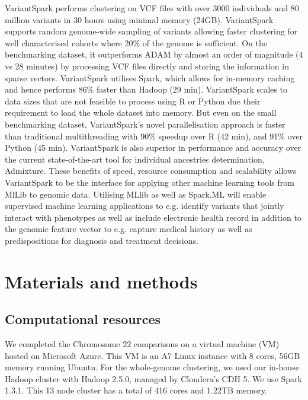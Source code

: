 \documentclass{bmcart}
\newcommand{\variantSpark}{{\sc VariantSpark}}
\begin{document}
\variantSpark{} performs clustering on VCF files with over 3000 individuals and 80 million variants in 30 hours using minimal memory (24GB). 
\variantSpark{} supports random genome-wide sampling of variants allowing faster clustering for well characterised cohorts where 20\% of the genome is sufficient. 
On the benchmarking dataset, it outperforms {\sc ADAM} by almost an order of magnitude (4 vs 28 minutes) by processing VCF files directly and storing the information in sparse vectors. %
\variantSpark{} utilises {\sc Spark}, which allows for in-memory caching and hence performs 86\% faster than Hadoop (29 min). %
\variantSpark{} scales to data sizes that are not feasible to process using R or Python due their requirement to load the whole dataset into memory. 
But even on the small benchmarking dataset, \variantSpark{}'s novel parallelisation approach is faster than traditional multithreading with 90\% speedup over R (42 min), and 91\% over Python (45 min). %
\variantSpark{} is also superior in performance and accuracy over the current state-of-the-art tool for individual ancestries determination, {\sc Admixture}.
These benefits of speed, resource consumption and scalability allows \variantSpark{} to be the interface for applying other machine learning tools from MlLib to genomic data. 
Utilising MLlib as well as Spark.ML will enable supervised machine learning applications to e.g. identify variants that jointly interact with phenotypes as well as include electronic health record in addition to the genomic feature vector to e.g. capture medical history as well as predispositions for diagnosis and treatment decisions. 




\section*{Materials and methods}
\subsection*{Computational resources}
We completed the Chromosome 22 comparisons on a virtual machine (VM) hosted on Microsoft Azure. This VM is an A7 Linux instance with 8 cores, 56GB
memory running Ubuntu. 
For the whole-genome clustering, we used our in-house Hadoop cluster with Hadoop 2.5.0, managed by Cloudera's CDH 5. We use Spark 1.3.1. This 13 node
cluster has a total of 416 cores and 1.22TB memory.
\end{document}
